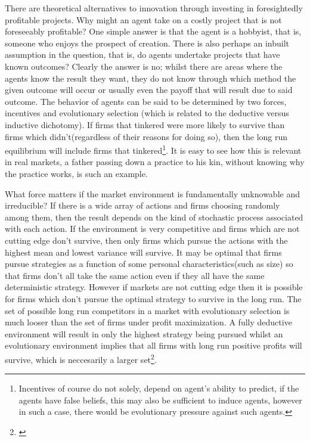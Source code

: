 There are theoretical alternatives to innovation through investing in foresightedly profitable projects. Why might an agent take on a costly project that is not foreseeably profitable? One simple answer is that the agent is a hobbyist, that is, someone who enjoys the prospect of creation. There is also perhaps an inbuilt assumption in the question, that is, do agents undertake projects that have known outcomes? Clearly the answer is no; whilst there are areas where the agents know the result they want, they do not know through which method the given outcome will occur or usually even the payoff that will result due to said outcome. The behavior of agents can be said to be determined by two forces, incentives and evolutionary selection (which is related to the deductive versus inductive dichotomy). If firms that tinkered were more likely to survive than firms which didn't(regardless of their reasons for doing so), then the long run equilibrium will include firms that tinkered\footnote{Incentives of course do not solely, depend on agent’s  ability to predict, if the agents have false beliefs, this may also be sufficient to induce agents, however in such a case, there would be evolutionary pressure against such agents.}. It is easy to see how this is relevant in real markets, a father passing down a practice to his kin, without knowing why the practice works, is such an example. 


What force matters if the market environment is fundamentally unknowable and irreducible? If there is a wide array of actions and firms choosing randomly among them, then the result depends on the kind of stochastic process associated with each action. If the environment is very competitive and firms which are not cutting edge don't survive, then only firms which pursue the actions with the highest mean and lowest variance will survive. It may be optimal that firms pursue strategies as a function of some personal characteristics(such as size) so that firms don't all take the same action even if they all have the same deterministic strategy. However if markets are not cutting edge then it is possible for firms which don't pursue the optimal strategy to survive in the long run. The set of possible long run competitors in a market with evolutionary selection is much looser than the set of firms under profit maximization. A fully deductive environment will result in only the highest strategy being pursued whilst an evolutionary environment implies that all firms with long run positive profits will survive, which is neccesarily a larger set\footnote{\citep{alchian1950uncertainty}}. 

